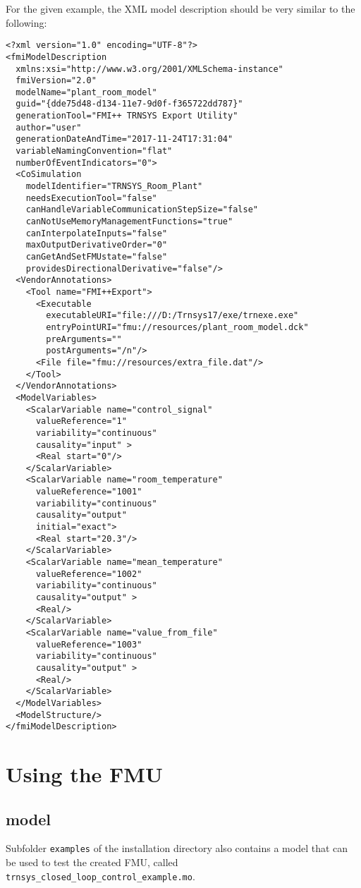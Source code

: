 For the given example, the XML model description should be very similar to the following:
\begin{verbatim}
<?xml version="1.0" encoding="UTF-8"?>
<fmiModelDescription
  xmlns:xsi="http://www.w3.org/2001/XMLSchema-instance"
  fmiVersion="2.0"
  modelName="plant_room_model"
  guid="{dde75d48-d134-11e7-9d0f-f365722dd787}"
  generationTool="FMI++ TRNSYS Export Utility"
  author="user"
  generationDateAndTime="2017-11-24T17:31:04"
  variableNamingConvention="flat"
  numberOfEventIndicators="0">
  <CoSimulation
    modelIdentifier="TRNSYS_Room_Plant"
    needsExecutionTool="false"
    canHandleVariableCommunicationStepSize="false"
    canNotUseMemoryManagementFunctions="true"
    canInterpolateInputs="false"
    maxOutputDerivativeOrder="0"
    canGetAndSetFMUstate="false"
    providesDirectionalDerivative="false"/>
  <VendorAnnotations>
    <Tool name="FMI++Export">
      <Executable
        executableURI="file:///D:/Trnsys17/exe/trnexe.exe"
        entryPointURI="fmu://resources/plant_room_model.dck"
        preArguments=""
        postArguments="/n"/>
      <File file="fmu://resources/extra_file.dat"/>
    </Tool>
  </VendorAnnotations>
  <ModelVariables>
    <ScalarVariable name="control_signal"
	  valueReference="1"
	  variability="continuous"
	  causality="input" >
      <Real start="0"/>
    </ScalarVariable>
    <ScalarVariable name="room_temperature"
	  valueReference="1001" 
	  variability="continuous" 
	  causality="output" 
	  initial="exact">
      <Real start="20.3"/>
    </ScalarVariable>
    <ScalarVariable name="mean_temperature" 
	  valueReference="1002" 
	  variability="continuous" 
	  causality="output" >
      <Real/>
    </ScalarVariable>
    <ScalarVariable name="value_from_file"
	  valueReference="1003" 
	  variability="continuous" 
	  causality="output" >
      <Real/>
    </ScalarVariable>
  </ModelVariables>
  <ModelStructure/>
</fmiModelDescription>
\end{verbatim}

\section{Using the FMU}

\subsection{\dymola model}

Subfolder \verb!examples! of the installation directory also contains a \dymola model that can be used to test the created \trnsys FMU, called \verb!trnsys_closed_loop_control_example.mo!.


